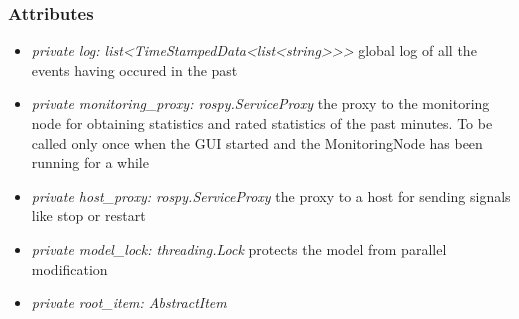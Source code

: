 \subsubsection{Attributes}
\begin{itemize}
  \item \textit{private log: list<TimeStampedData<list<string>>>} global log of all the events having occured in the past
  \item \textit{private monitoring\_proxy: rospy.ServiceProxy} the proxy to the monitoring node for obtaining statistics and rated statistics of the past minutes. To be called only once when the GUI started and the MonitoringNode has been running for a while 
  \item \textit{private host\_proxy: rospy.ServiceProxy} the proxy to a host for sending signals like stop or restart
  \item \textit{private model\_lock: threading.Lock} protects the model from parallel modification
  \item \textit{private root\_item: AbstractItem} 
\end{itemize}
